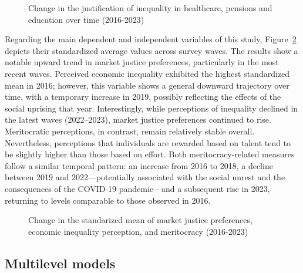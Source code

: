 \documentclass[
  12pt,
]{article}
\begin{document}
\begin{figure}[H]

\caption{\label{fig-alluvial}Change in the justification of inequality
in healthcare, pensions and education over time (2016-2023)}


\end{figure}%

Regarding the main dependent and independent variables of this study,
Figure~\ref{fig-meanchange} depicts their standardized average values
across survey waves. The results show a notable upward trend in market
justice preferences, particularly in the most recent waves. Perceived
economic inequality exhibited the highest standardized mean in 2016;
however, this variable shows a general downward trajectory over time,
with a temporary increase in 2019, possibly reflecting the effects of
the social uprising that year. Interestingly, while perceptions of
inequality declined in the latest waves (2022--2023), market justice
preferences continued to rise. Meritocratic perceptions, in contrast,
remain relatively stable overall. Nevertheless, perceptions that
individuals are rewarded based on talent tend to be slightly higher than
those based on effort. Both meritocracy-related measures follow a
similar temporal pattern: an increase from 2016 to 2018, a decline
between 2019 and 2022---potentially associated with the social unrest
and the consequences of the COVID-19 pandemic---and a subsequent rise in
2023, returning to levels comparable to those observed in 2016.

\begin{figure}[H]

\caption{\label{fig-meanchange}Change in the standarized mean of market
justice preferences, economic inequality perception, and meritocracy
(2016-2023)}


\end{figure}%

\subsection{Multilevel models}\label{multilevel-models}
\end{document}
